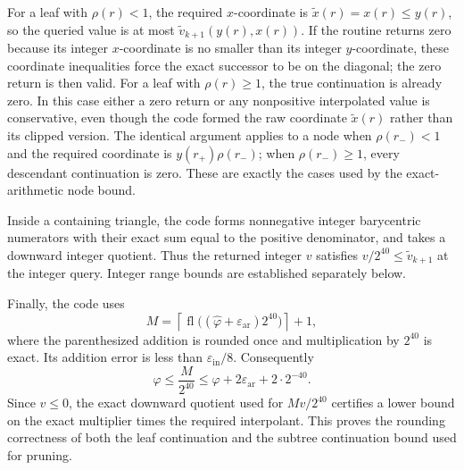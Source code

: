 For a leaf with $\rho(r)<1$, the required $x$-coordinate is
$\widetilde x(r)=x(r)\le y(r)$, so the queried value is at most
$\widetilde v_{k+1}(y(r),x(r))$. If the routine returns zero because its integer
$x$-coordinate is no smaller than its integer $y$-coordinate, these
coordinate inequalities force the exact successor to be on the
diagonal; the zero return is then valid. For a leaf with $\rho(r)\ge1$,
the true continuation is already zero. In this case either a zero
return or any nonpositive interpolated value is conservative, even
though the code formed the raw coordinate $\widetilde x(r)$ rather
than its clipped version.
The identical argument applies to a node when $\rho(r_-)<1$ and the
required coordinate is $y(r_+)\rho(r_-)$; when $\rho(r_-)\ge1$, every
descendant continuation is zero. These are exactly the cases used by
the exact-arithmetic node bound.

Inside a containing triangle, the code forms nonnegative integer
barycentric numerators with their exact sum equal to the positive
denominator, and takes a downward integer quotient. Thus the returned
integer $v$ satisfies $v/2^{40}\le\widetilde v_{k+1}$ at the integer query. Integer
range bounds are established separately below.

Finally, the code uses
\[
 M=\left\lceil
     \operatorname{fl}\bigl((\widehat\varphi+
                       \varepsilon_{\mathrm{ar}})2^{40}\bigr)
    \right\rceil+1,
\]
where the parenthesized addition is rounded once and multiplication
by $2^{40}$ is exact. Its addition error is less than
$\varepsilon_{\mathrm{in}}/8$. Consequently
\[
 \varphi\le\frac M{2^{40}}
 \le\varphi+2\varepsilon_{\mathrm{ar}}+2\cdot2^{-40}.
\]
Since $v\le0$, the exact downward quotient used for
$Mv/2^{40}$ certifies a lower bound on the exact multiplier times
the required interpolant. This proves the rounding correctness of
both the leaf continuation and the subtree continuation bound used
for pruning.
